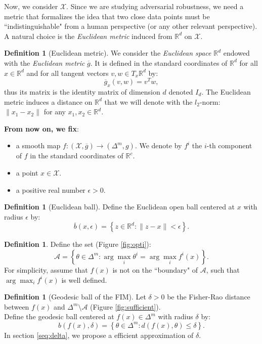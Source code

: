 \documentclass[entropy,article,submit,pdftex,moreauthors]{Definitions/mdpi}
\newcommand{\R}{\ensuremath{\mathbb{R}}}
\theoremstyle{plain}
\theoremstyle{definition}
\newtheorem{definition}[theorem]{Definition}
\newcommand{\A}{\mathcal{A}}
\newcommand{\X}{\mathcal{X}}
\newcommand{\gb}{\overline{g}}
\begin{document}
Now, we consider $\X$. Since we are studying adversarial robustness, we need a metric that formalizes the idea that two close data points must be ``indistinguishable" from a human perspective (or any other relevant perspective). A natural choice is the \emph{Euclidean metric} induced from $\R^d$ on $\X$.
\begin{definition}[Euclidean metric]
    We consider the \emph{Euclidean space} $\R^d$ endowed with the \emph{Euclidean metric} $\gb$. It is defined in the standard coordinates of $\R^d$ for all $x \in \R^d$ and for all tangent vectors $v,w \in T_x \R^d$ by:
    \begin{equation*}
        \gb_x(v,w) = v^T w,
    \end{equation*}
    thus its matrix is the identity matrix of dimension $d$ denoted $I_d$. The Euclidean metric induces a distance on $\R^d$ that we will denote with the $l_2$-norm: $\|x_1 - x_2 \|$ for any $x_1, x_2 \in \R^d$.
\end{definition}
\noindent \textbf{From now on, we fix}:
\begin{itemize}
    \item a smooth map $f : (\X, \gb) \rightarrow (\Delta^m, g)$. We denote by $f^i$ the $i$-th component of $f$ in the standard coordinates of $\R^c$.
    \item a point $x \in \X$.
    \item a positive real number $\epsilon > 0$.
\end{itemize}

\begin{definition}[Euclidean ball]
    Define the Euclidean open ball centered at $x$ with radius $\epsilon$ by:
    \begin{equation*}
        \overline{b}(x, \epsilon) = \left\{ z \in \R^d : \|z-x\| < \epsilon \right\}.
    \end{equation*}
\end{definition}

\begin{definition}
    Define the set (Figure \ref{fig:opti}):
    \begin{equation*}
        \A = \left\{ \theta \in \Delta^m : \arg \max_i \theta^i = \arg \max_i f^i(x)\right\}.
    \end{equation*}
    For simplicity, assume that $f(x)$ is not on the ``boundary" of $\A$, such that $\arg \max_i f^i(x)$ is well defined.
\end{definition}

\begin{definition}[Geodesic ball of the FIM]
    Let $\delta > 0$ be the Fisher-Rao distance between $f(x)$ and $\Delta^m \setminus \A$ (Figure \ref{fig:sufficient}). \\
    Define the geodesic ball centered at $f(x) \in \Delta^m$ with radius $\delta$ by:
    \begin{equation*}
        b(f(x), \delta) = \left\{ \theta \in \Delta^m : d(f(x), \theta) \leq \delta \right\}.
    \end{equation*}
    In section \ref{seq:delta}, we propose a efficient approximation of $\delta$.
\end{definition}
\end{document}
